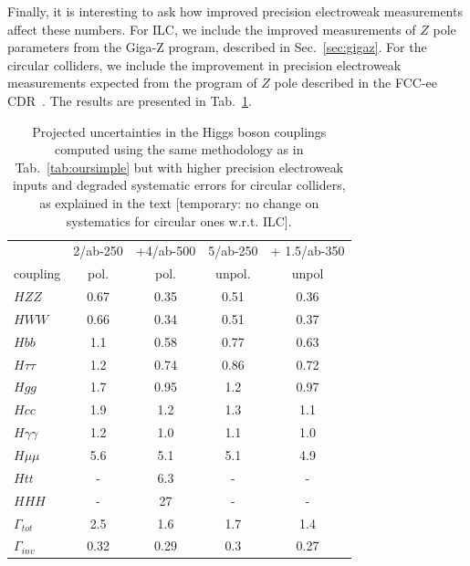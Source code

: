 Finally, it is interesting to ask how improved precision electroweak
measurements affect these numbers. For ILC, we include the improved 
measurements of $Z$ pole parameters  from the Giga-Z program,
described
in Sec.~\ref{sec:gigaz}.  For the circular colliders, 
we include the improvement in
precision electroweak measurements expected from the program of $Z$
pole described in the FCC-ee CDR~\cite{Benedikt:2018qee}. The results are presented in 
Tab.~\ref{tab:ournotsosimple}. 

\begin{table}[!htbp]
\begin{center}
\begin{tabular}{l|cc|c|c}
 &  2/ab-250 & +4/ab-500 &  5/ab-250 &  + 1.5/ab-350\\
coupling &  pol.  &   pol.  &   unpol.  &  unpol  
  \\  \hline 
$HZZ$            &             0.67&   0.35    &   0.51   & 0.36            \\ 
$HWW$            &         0.66  &   0.34   &   0.51   &   0.37    \\ 
 $Hbb$            &     1.1  &  0.58   &  0.77    &    0.63       \\ 
$H\tau\tau$    &          1.2  &   0.74   &   0.86   &  0.72      \\ 
$Hgg$ &                      1.7  & 0.95       &  1.2    &  0.97     \\ 
$Hcc$                       &   1.9  &  1.2   &   1.3   &   1.1    \\ 
$H\gamma\gamma$ &  1.2 &   1.0     &  1.1    &   1.0   \\ 
$H\mu\mu$                &  5.6  &  5.1     &  5.1    &  4.9   
 \\ 
$Htt$  &                       -     &      6.3     &  -    &  -     \\ 
$HHH$                         &  -    &   27     &   -   &   -  \\ \hline 
$\Gamma_{tot}$             & 2.5  & 1.6    &   1.7    &  1.4       \\  
$\Gamma_{inv}$          &   0.32  & 0.29    &  0.3    &   0.27  \\  \hline
\end{tabular}
\end{center}
\caption{ \label{tab:ournotsosimple}    Projected uncertainties in the Higgs
  boson couplings computed using the same methodology as in Tab.~\ref{tab:oursimple} but with higher precision electroweak inputs and degraded systematic errors for circular colliders, as explained in the text [temporary: no change on systematics for circular ones w.r.t. ILC].  }
\end{table}




